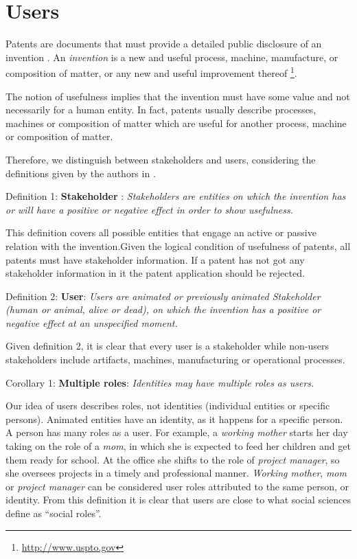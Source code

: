 \documentclass[b5paper,]{book}
\let\rmarkdownfootnote\footnote%
\def\footnote{\protect\rmarkdownfootnote}
\theoremstyle{definition}
\theoremstyle{definition}
\theoremstyle{definition}
\theoremstyle{remark}
\begin{document}
\section{Users}\label{usersresults}

Patents are documents that must provide a detailed public disclosure of
an invention \citep{wipo2}. An \emph{invention} is a new and useful
process, machine, manufacture, or composition of matter, or any new and
useful improvement thereof \footnote{\url{http://www.uspto.gov}}.

The notion of usefulness implies that the invention must have some value
and not necessarily for a human entity. In fact, patents usually
describe processes, machines or composition of matter which are useful
for another process, machine or composition of matter.

Therefore, we distinguish between stakeholders and users, considering
the definitions given by the authors in \citep{bonam2017}.

Definition 1: \textbf{Stakeholder} : \emph{Stakeholders are entities on
which the invention has or will have a positive or negative effect in
order to show usefulness.}

This definition covers all possible entities that engage an active or
passive relation with the invention.Given the logical condition of
usefulness of patents, all patents must have stakeholder information. If
a patent has not got any stakeholder information in it the patent
application should be rejected.

Definition 2: \textbf{User}: \emph{Users are animated or previously
animated Stakeholder (human or animal, alive or dead), on which the
invention has a positive or negative effect at an unspecified moment.}

Given definition 2, it is clear that every user is a stakeholder while
non-users stakeholders include artifacts, machines, manufacturing or
operational processes.

Corollary 1: \textbf{Multiple roles}: \emph{Identities may have multiple
roles as users.}

Our idea of users describes roles, not identities (individual entities
or specific persons). Animated entities have an identity, as it happens
for a specific person. A person has many roles as a user. For example, a
\emph{working mother} starts her day taking on the role of a \emph{mom},
in which she is expected to feed her children and get them ready for
school. At the office she shifts to the role of \emph{project manager},
so she oversees projects in a timely and professional manner.
\emph{Working mother}, \emph{mom} or \emph{project manager} can be
considered user roles attributed to the same person, or identity. From
this definition it is clear that users are close to what social sciences
define as ``social roles''.
\end{document}
